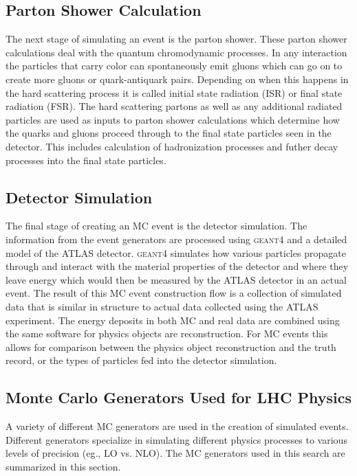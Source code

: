 \subsection{Parton Shower Calculation}
The next stage of simulating an event is the parton shower.  These parton shower calculations deal with the quantum chromodynamic processes.  In any interaction the particles that carry color can spontaneously emit gluons which can go on to create more gluons or quark-antiquark pairs.  Depending on when this happens in the hard scattering process it is called initial state radiation (ISR) or final state radiation (FSR).   The hard scattering partons as well as any additional radiated particles are used as inputs to parton shower calculations which determine how the quarks and gluons proceed through to the final state particles seen in the detector.  This includes calculation of hadronization processes and futher decay processes into the final state particles.

\subsection{Detector Simulation}
The final stage of creating an MC event is the detector simulation.  The information from the event generators are processed using \textsc{geant4} \cite{Geant4} and a detailed model of the ATLAS detector.  \textsc{geant4} simulates how various particles propagate through and interact with the material properties of the detector and where they leave energy which would then be measured by the ATLAS detector in an actual event.  The result of this MC event construction flow is a collection of simulated data that is similar in structure to actual data collected using the ATLAS experiment.  The energy deposits in both MC and real data are combined using the same software for physics objects are reconstruction.  For MC events this allows for comparison between the physics object reconstruction and the truth record, or the types of particles fed into the detector simulation.

\subsection{Monte Carlo Generators Used for LHC Physics}

A variety of different MC generators are used in the creation of simulated events.  Different generators specialize in simulating different physics processes to various levels of precision (eg., LO vs. NLO). The MC generators used in this search are summarized in this section.

